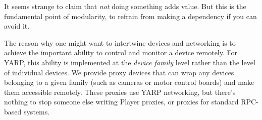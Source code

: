 It seems strange to claim that {\em not} doing something adds value.
But this is the fundamental point of modularity, to refrain from 
making a dependency if you can avoid it.

The reason why one might want to intertwine devices and networking
is to achieve the important ability to control and monitor a device 
remotely.  For YARP, this ability is implemented at the 
{\em device family} level rather than the level of individual devices.
We provide proxy devices that can wrap any devices belonging to
a given family (such as cameras or motor control boards) and make 
them accessible remotely.  These proxies use YARP networking, but
there's nothing to stop someone else writing Player proxies, or 
proxies for standard RPC-based systems.

%
%












